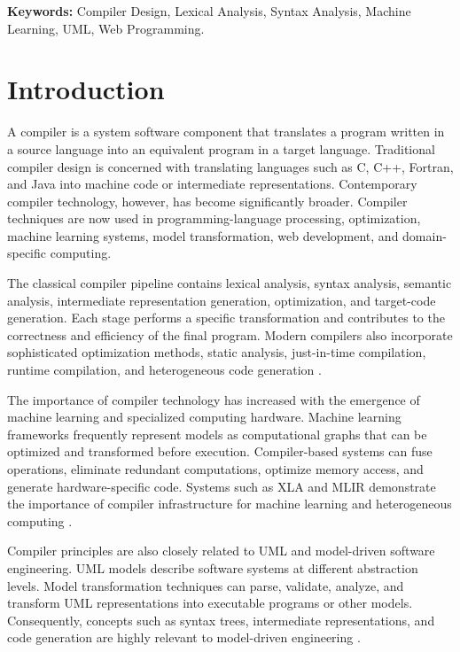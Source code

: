 \documentclass[12pt,a4paper]{article}
\begin{document}
\textbf{Keywords:}
Compiler Design, Lexical Analysis, Syntax Analysis, Machine Learning,
UML, Web Programming.

\newpage

\section{Introduction}

A compiler is a system software component that translates a program written in
a source language into an equivalent program in a target language. Traditional
compiler design is concerned with translating languages such as C, C++,
Fortran, and Java into machine code or intermediate representations.
Contemporary compiler technology, however, has become significantly broader.
Compiler techniques are now used in programming-language processing,
optimization, machine learning systems, model transformation, web
development, and domain-specific computing.

The classical compiler pipeline contains lexical analysis, syntax analysis,
semantic analysis, intermediate representation generation, optimization, and
target-code generation. Each stage performs a specific transformation and
contributes to the correctness and efficiency of the final program. Modern
compilers also incorporate sophisticated optimization methods, static
analysis, just-in-time compilation, runtime compilation, and heterogeneous
code generation \cite{aho2006,cooper2007,appel2004}.

The importance of compiler technology has increased with the emergence of
machine learning and specialized computing hardware. Machine learning
frameworks frequently represent models as computational graphs that can be
optimized and transformed before execution. Compiler-based systems can fuse
operations, eliminate redundant computations, optimize memory access, and
generate hardware-specific code. Systems such as XLA and MLIR demonstrate
the importance of compiler infrastructure for machine learning and
heterogeneous computing \cite{abadi2016,lattner2021}.

Compiler principles are also closely related to UML and model-driven software
engineering. UML models describe software systems at different abstraction
levels. Model transformation techniques can parse, validate, analyze, and
transform UML representations into executable programs or other models.
Consequently, concepts such as syntax trees, intermediate representations, and
code generation are highly relevant to model-driven engineering
\cite{fowler2004,mellor2004}.
\end{document}
